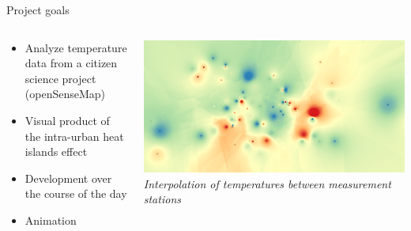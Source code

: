 \begin{frame}{Project goals}
\begin{columns}[T] %
	\begin{column}{.56\textwidth}
		\begin{itemize}
			\item Analyze temperature data from a citizen science project (openSenseMap)
			\item Visual product of the intra-urban heat islands effect
			\item Development over the course of the day
			\item Animation
		\end{itemize}
	\end{column}%
	\hfill%
	\begin{column}{.44\textwidth}
		\includegraphics[width=\linewidth]{../writeup/images/interpolation_idw.png}\\
		\textit{\footnotesize Interpolation of temperatures between measurement stations}
	\end{column}%
\end{columns}
\end{frame}